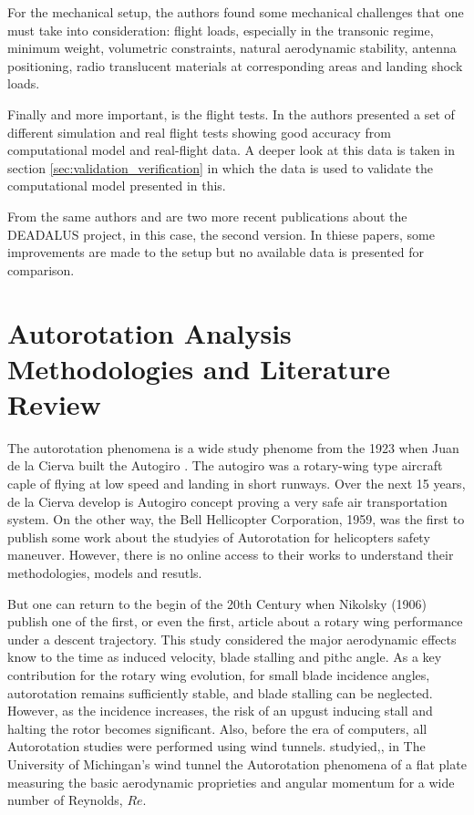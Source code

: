 For the mechanical setup, the authors \cite{noauthor_daedalus_nodate} found some mechanical challenges that one must take into consideration: flight loads, especially in the transonic regime, minimum weight, volumetric constraints, natural aerodynamic stability, antenna positioning, radio translucent materials at corresponding areas and landing shock loads.

Finally and more important, is the flight tests. In \cite{riegler_project_nodate} the authors presented a set of different simulation and real flight tests showing good accuracy from computational model and real-flight data. A deeper look at this data is taken in section \ref{sec:validation_verification} in which the data is used to validate the computational model presented in this.

From the same authors \cite{mehringer_suborbital_2022} and \cite{bergmann_daedalus_2024} are two more recent publications about the DEADALUS project, in this case, the second version. In thiese papers, some improvements are made to the setup but no available data is presented for comparison.


\section{Autorotation Analysis Methodologies and Literature Review}
\label{section:literature_review}

The autorotation phenomena is a wide study phenome from the 1923 when Juan de la Cierva built the Autogiro \cite{leishman_principles_2006}. The autogiro was a rotary-wing type aircraft caple of flying at low speed and landing in short runways. Over the next 15 years, de la Cierva develop is Autogiro concept proving a very safe air transportation system. On the other way, the Bell Hellicopter Corporation, 1959, was the first to publish \cite{diaz-silva_rotary_2013} some work about the studyies of Autorotation for helicopters safety maneuver. However, there is no online access to their works to understand their methodologies, models and resutls. 

But one can return to the begin of the  20th Century when Nikolsky (1906) \cite{nikolsky_analytical_1906} publish one of the first, or even the first, article about 
a rotary wing performance under a descent trajectory. This study considered the major aerodynamic effects know to the time as induced velocity, blade stalling and pithc angle. As a key contribution for the rotary wing evolution, for small blade incidence angles, autorotation remains sufficiently stable, and blade stalling can be neglected. However, as the incidence increases, the risk of an upgust inducing stall and halting the rotor becomes significant. Also, before the era of computers, all Autorotation studies were performed using wind tunnels. \cite{smith_autorotating_1971} studyied,, in The University of Michingan's wind tunnel the Autorotation phenomena of a flat plate measuring the basic aerodynamic proprieties and angular momentum for a wide number of Reynolds, $Re$. 


